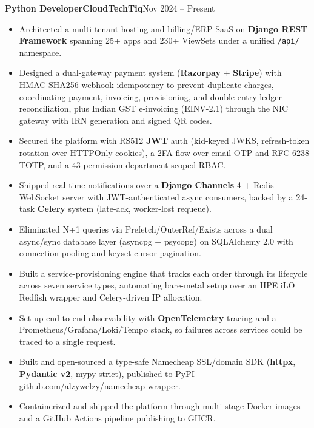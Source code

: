 \documentclass[11pt,a4paper]{article}
\newcommand{\entry}[3]{%
  \vspace{4.5pt}\noindent\textbf{#1}\hfill\textbf{#2}\hfill{\color{subtlegray}#3}\par\vspace{2pt}}
\begin{document}
\entry{Python Developer}{CloudTechTiq}{Nov 2024 -- Present}
\begin{itemize}
  \item Architected a multi-tenant hosting and billing/ERP SaaS on \textbf{Django
        REST Framework} spanning 25+ apps and 230+ ViewSets under a unified
        \texttt{/api/} namespace.
  \item Designed a dual-gateway payment system (\textbf{Razorpay} +
        \textbf{Stripe}) with HMAC-SHA256 webhook idempotency to prevent duplicate
        charges, coordinating payment, invoicing, provisioning, and double-entry
        ledger reconciliation, plus Indian GST e-invoicing (EINV-2.1) through the
        NIC gateway with IRN generation and signed QR codes.
  \item Secured the platform with RS512 \textbf{JWT} auth (kid-keyed JWKS,
        refresh-token rotation over HTTPOnly cookies), a 2FA flow over email OTP
        and RFC-6238 TOTP, and a 43-permission department-scoped RBAC.
  \item Shipped real-time notifications over a \textbf{Django Channels} 4 + Redis
        WebSocket server with JWT-authenticated async consumers, backed by a
        24-task \textbf{Celery} system (late-ack, worker-lost requeue).
  \item Eliminated N+1 queries via Prefetch/OuterRef/Exists across a dual
        async/sync database layer (asyncpg + psycopg) on SQLAlchemy 2.0 with
        connection pooling and keyset cursor pagination.
  \item Built a service-provisioning engine that tracks each order through its
        lifecycle across seven service types, automating bare-metal setup over an
        HPE iLO Redfish wrapper and Celery-driven IP allocation.
  \item Set up end-to-end observability with \textbf{OpenTelemetry} tracing and a
        Prometheus/Grafana/Loki/Tempo stack, so failures across services could be
        traced to a single request.
  \item Built and open-sourced a type-safe Namecheap SSL/domain SDK
        (\textbf{httpx}, \textbf{Pydantic v2}, mypy-strict), published to PyPI ---
        \href{https://github.com/alzywelzy/namecheap-wrapper}{github.com/alzywelzy/namecheap-wrapper}.
  \item Containerized and shipped the platform through multi-stage Docker images
        and a GitHub Actions pipeline publishing to GHCR.
\end{itemize}
\end{document}
